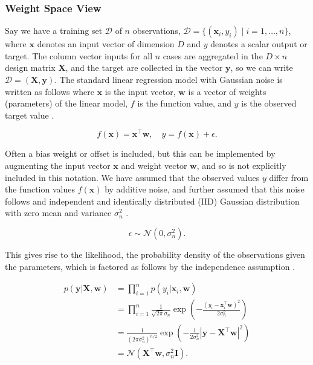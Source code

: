 \documentclass[../../../main.tex]{subfiles}
\begin{document}
\subsubsection{Weight Space View}

Say we have a training set $\mathcal{D}$ of $n$ observations, $\mathcal{D} = \{ (\bm{x}_i,y_i) \mid i=1,\ldots,n\}$, where $\bm{x}$ denotes an input vector of dimension $D$ and $y$ denotes a scalar output or target. The column vector inputs for all $n$ cases are aggregated in the $D \times n$ design matrix $\bm{X}$, and the target are collected in the vector $\bm{y}$, so we can write $\mathcal{D}=(\bm{X},\bm{y})$. The standard linear regression model with Gaussian noise is written as follows where $\bm{x}$ is the input vector, $\bm{w}$ is a vector of weights (parameters) of the linear model, $f$ is the function value, and $y$ is the observed target value \autocite{Rasmussen2005}.

\begin{equation}
f(\bm{x}) = \bm{x}^\top\bm{w}, \quad y = f(\bm{x}) + \epsilon.
\end{equation}

Often a bias weight or offset is included, but this can be implemented by augmenting the input vector $\bm{x}$ and weight vector $\bm{w}$, and so is not explicitly included in this notation. We have assumed that the observed values $y$  differ from the function values $f(\bm{x})$ by additive noise, and further assumed that this noise follows and independent and identically distributed (IID) Gaussian distribution with zero mean and variance $\sigma_n^2$ \autocite{Rasmussen2005}.

\begin{equation}
\epsilon \sim \mathcal{N}(0, \sigma_n^2).
\end{equation}

This gives rise to the likelihood, the probability density of the observations given the parameters, which is factored as follows by the independence assumption \autocite{Rasmussen2005}.

\begin{equation}
\begin{split}
p(\bm{y}|\bm{X},\bm{w}) &= \prod_{i=1}^{n}p(y_i|\bm{x}_i,\bm{w}) \\
&= \prod_{i=1}^{n} \frac{1}{\sqrt{2\pi}\sigma_n} \exp\left(-\frac{(y_i-\bm{x}_i^\top\bm{w})^2}{2\sigma_n^2}\right) \\
&= \frac{1}{(2\pi\sigma_n^2)^{n/2}} \exp\left(-\frac{1}{2\sigma_n^2}\left|\bm{y}-\bm{X}^\top\bm{w}\right|^2\right) \\
&= \mathcal{N}(\bm{X}^\top\bm{w},\sigma_n^2\bm{I}).
\end{split}
\end{equation}
\end{document}
